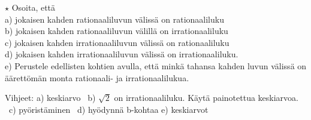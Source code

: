 \begin{tehtavasivu}
\begin{tehtava}
$\star$ Osoita, että \\
a) jokaisen kahden rationaaliluvun välissä on rationaaliluku \\
b) jokaisen kahden rationaaliluvun välillä on irrationaaliluku \\
c) jokaisen kahden irrationaaliluvun välissä on rationaaliluku \\
d) jokaisen kahden irrationaaliluvun välissä on irrationaaliluku. \\
e) Perustele edellisten kohtien avulla, että minkä tahansa kahden luvun
välissä on äärettömän monta rationaali- ja irrationaalilukua.
\begin{vastaus}
Vihjeet: a) keskiarvo \ b) $\sqrt{2}$ on irrationaaliluku. Käytä
painotettua keskiarvoa. \ c) pyöristäminen \ d) hyödynnä b-kohtaa
e) keskiarvot
\end{vastaus}
\end{tehtava}

\end{tehtavasivu}
